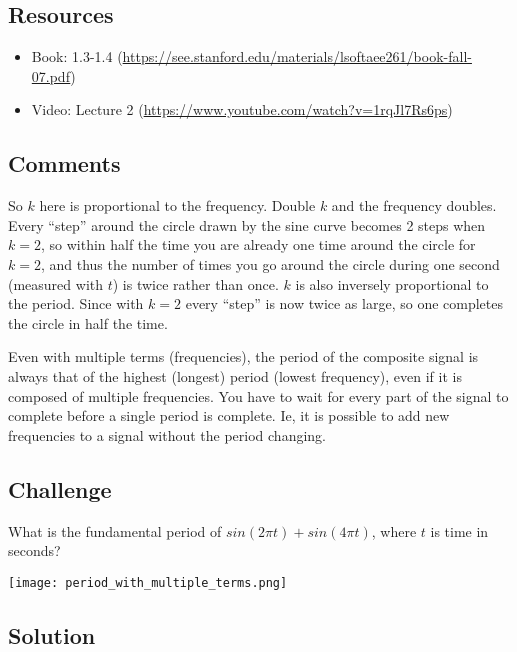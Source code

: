 \subsection*{Resources}
\begin{itemize}
    \item Book: 1.3-1.4 (\url{https://see.stanford.edu/materials/lsoftaee261/book-fall-07.pdf})
    \item Video: Lecture 2 (\url{https://www.youtube.com/watch?v=1rqJl7Rs6ps})
\end{itemize}

\subsection*{Comments}
So $k$ here is proportional to the frequency. Double $k$ and the frequency doubles. Every ``step'' around the circle drawn by the sine curve becomes 2 steps when $k=2$, so within half the time you are already one time around the circle for $k=2$, and thus the number of times you go around the circle during one second (measured with $t$) is twice rather than once. $k$ is also inversely proportional to the period. Since with $k=2$ every ``step'' is now twice as large, so one completes the circle in half the time.

Even with multiple terms (frequencies), the period of the composite signal is always that of the highest (longest) period (lowest frequency), even if it is composed of multiple frequencies. You have to wait for every part of the signal to complete before a single period is complete. Ie, it is possible to add new frequencies to a signal without the period changing.

\subsection*{Challenge}
What is the fundamental period of $sin(2 \pi t) + sin(4 \pi t)$, where $t$ is time in seconds?

\texttt{[image: period\_with\_multiple\_terms.png]}

\subsection*{Solution}


\timebox




\newpage
